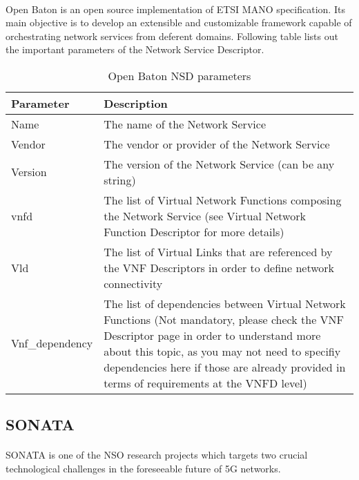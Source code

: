 \paragraph{}
Open Baton is an open source implementation of ETSI MANO specification. Its main objective is to develop an extensible and customizable framework capable of orchestrating network services from deferent domains\cite{openBaton}. Following table lists out the important parameters of the Network Service Descriptor\cite{openBatonSchemaDocumentation}. 
    \begin{table}[h]
        \centering
        \begin{tabular}{ |p{4cm}|p{10cm}|}
            \hline
            \textbf{Parameter} & \textbf{Description} \\
            \hline
             
             Name & The name of the Network Service \\
             \hline
             Vendor & The vendor or provider of the Network Service \\
             \hline
             Version & The version of the Network Service (can be any string) \\
             \hline
             vnfd & The list of Virtual Network Functions composing the Network Service (see Virtual Network Function Descriptor for more details) \\
             \hline
             Vld & The list of Virtual Links that are referenced by the VNF Descriptors in order to define network connectivity \\
             \hline
             Vnf\_dependency & The list of dependencies between Virtual Network Functions (Not mandatory, please check the VNF Descriptor page in order to understand more about this topic, as you may not need to specifiy dependencies here if those are already provided in terms of requirements at the VNFD level) \\
             \hline
        \end{tabular}
        \caption{Open Baton NSD parameters}
        \label{tab:OpenBatonSchema}
    \end{table}

\subsection{SONATA}
\paragraph{}
SONATA is one of the NSO research projects which targets two crucial technological challenges in the foreseeable future of 5G networks\cite{SONATA}.

